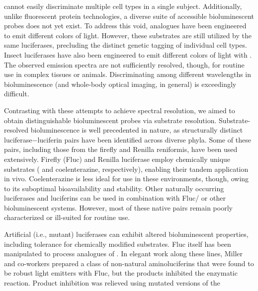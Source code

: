 cannot easily discriminate multiple cell types in a single subject.
Additionally, unlike fluorescent protein technologies, a diverse
suite of accessible bioluminescent probes does not yet exist. To
address this void, \dluciferin{} analogues have been engineered to
emit different colors of light.\cite{RN14,Jathoul:2014do,RN165} However, these substrates are
still utilized by the same luciferases, precluding the distinct
genetic tagging of individual cell types. Insect luciferases have
also been engineered to emit different colors of light with \dluciferin{}.\cite{Branchini:2007fza,Branchini:2007bw,Mezzanotte:2010fq}
The observed emission spectra are not sufficiently
resolved, though, for routine use in complex tissues or animals.
Discriminating among different wavelengths in bioluminescence
(and whole-body optical imaging, in general) is
exceedingly difficult.
\par
Contrasting with these attempts to achieve spectral
resolution, we aimed to obtain distinguishable bioluminescent
probes via substrate resolution. Substrate-resolved bioluminescence
is well precedented in nature, as structurally distinct
luciferase−luciferin pairs have been identified across diverse
phyla.\cite{Haddock:2010cx, Oba:2014cc, RN45} Some of these pairs, including those from the firefly
and Renilla reniformis, have been used extensively.\cite{RN26, Badr:2011if, Porterfield:2015bu, Massoud:2007en} Firefly
(Fluc) and Renilla luciferase employ chemically unique
substrates (\dluciferin{} and coelenterazine, respectively), enabling
their tandem application in vivo.\cite{Bhaumik:2002hf, Maguire:2013kb} Coelenterazine is
less ideal for use in these environments, though, owing to its
suboptimal bioavailability and stability.\cite{RN26, Pichler:2004ke} Other naturally
occurring luciferases and luciferins can be used in combination
with Fluc/\dluciferin{} or other bioluminescent systems.\cite{Maguire:2013kb, Petushkov:2014ha}
However, most of these native pairs remain poorly characterized
or ill-suited for routine use.
\par
Artificial (i.e., mutant) luciferases can exhibit altered
bioluminescent properties, including tolerance for chemically
modified substrates. Fluc itself has been manipulated to process
analogues of \dluciferin{}.\cite{RN98} In elegant work along these lines,
Miller and co-workers prepared a class of non-natural
aminoluciferins that were found to be robust light emitters
with Fluc, but the products inhibited the enzymatic reaction.\cite{Reddy:2010gaa}
Product inhibition was relieved using mutated versions of the
